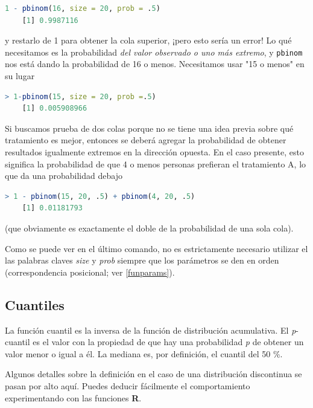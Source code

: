 \begin{lstlisting}[language=R]
    1 - pbinom(16, size = 20, prob = .5)
    [1] 0.9987116
\end{lstlisting}

y restarlo de 1 para obtener la cola superior, ¡pero esto sería un error! Lo qué
necesitamos es la probabilidad \textit{del valor observado o uno más extremo}, y
\texttt{pbinom} nos está dando la probabilidad de 16 o menos. Necesitamos usar
"15 o menos" en su lugar

\begin{lstlisting}[language=R]
    > 1-pbinom(15, size = 20, prob =.5)
    [1] 0.005908966
\end{lstlisting}

Si buscamos prueba de dos colas porque no se tiene una idea previa sobre qué
tratamiento es mejor, entonces se deberá agregar la probabilidad de obtener
resultados igualmente extremos en la dirección opuesta. En el caso presente,
esto significa la probabilidad de que 4 o menos personas prefieran el tratamiento A, lo
que da una probabilidad debajo

\begin{lstlisting}[language=R]
    > 1 - pbinom(15, 20, .5) + pbinom(4, 20, .5)
    [1] 0.01181793
\end{lstlisting}

(que obviamente es exactamente el doble de la probabilidad de una sola cola).

Como se puede ver en el último comando, no es estrictamente necesario utilizar
el las palabras claves \textit{size} y \textit{prob} siempre que los parámetros
se den en orden (correspondencia posicional; ver \ref{funparams}).

\subsection{Cuantiles}

La función cuantil es la inversa de la función de distribución acumulativa. El
\textit{p}-cuantil es el valor con la propiedad de que hay una probabilidad
\textit{p} de obtener un valor menor o igual a él. La mediana es, por
definición, el cuantil del 50 \%.

Algunos detalles sobre la definición en el caso de una distribución discontinua
se pasan por alto aquí. Puedes deducir fácilmente el comportamiento
experimentando con las funciones \textbf{R}.

